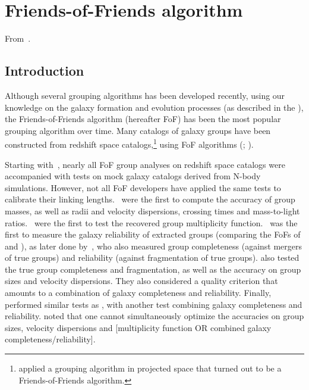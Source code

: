 \def\bpar{$b_\parallel$}
\def\bperp{$b_\bot$}

\chapter{Friends-of-Friends algorithm}
\label{cha:friends_of_friends_algorithm}
\minitoc%

From~\cite{Duarte+14}.

\section{Introduction}
\label{sec:fof_introduction}

Although several grouping algorithms has been developed recently, using our
knowledge on the galaxy formation and evolution processes (as described in the
), the Friends-of-Friends algorithm
(hereafter FoF) has been the most popular grouping algorithm over time. Many
catalogs of galaxy groups have been constructed from redshift space
catalogs,\footnote{\cite{TG76} applied a grouping algorithm in projected space
that turned out to be a Friends-of-Friends algorithm.} using FoF algorithms
(\citealp*{HG82,NW87,RGH89,TrasartiBattistoni98,MZ02};
\citealp{Eke+04,Berlind+06,Tago+10,Robotham+11,Tempel+14}).

Starting with~\cite{NW87},  nearly all FoF group analyses on redshift space
catalogs were accompanied with tests on mock galaxy catalogs derived from
N-body simulations. However, not all FoF developers have applied the same tests
to calibrate their linking lengths.~\cite{NW87} were the first to compute the
accuracy of group masses, as well as radii and velocity dispersions, crossing
times and mass-to-light ratios.~\cite{RGH89} were the first to test the
recovered group multiplicity function.~\cite{Frederic95a} was the first to
measure the galaxy reliability of extracted groups (comparing the FoFs of
\citealp{HG82} and \citealp{NW87}), as later done by~\cite{MZ02}, who also
measured group completeness (against mergers of true groups) and reliability
(against fragmentation of true groups). \citet{Eke+04} also tested the true
group completeness and fragmentation, as well as the accuracy on group sizes
and velocity dispersions. They also considered a quality criterion that amounts
to a combination of galaxy completeness and reliability. Finally,
\citet{Berlind+06} performed similar tests as \citeauthor{Eke+04}, with another
test combining galaxy completeness and reliability. \citeauthor{Berlind+06}
noted that one cannot simultaneously optimize the accuracies on group sizes,
velocity dispersions and [multiplicity function OR combined galaxy
completeness/reliability].

